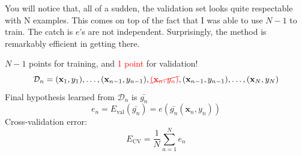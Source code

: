 \documentclass[10pt]{article}
\numberwithin{equation}{section}  %
\begin{document}
You will notice that, all of a sudden, the validation set looks quite respectable with N examples. This comes on top of the fact that I was able to use $N-1$ to train. The catch is $e$'s are not independent. Surprisingly, the method is remarkably efficient in getting there.

$N-1$ points for training, and \textcolor{red}{1 point} for validation!
\[
    \mathcal{D}_n = (\mathbf{x}_1,y_1), \dots, (\mathbf{x}_{n-1},y_{n-1}), \textcolor{red}{\cancel{(\mathbf{x}_n,y_n)}}, (\mathbf{x}_{n-1},y_{n-1}), \dots, (\mathbf{x}_N,y_N)
\]
Final hypothesis learned from $\mathcal{D}_n$ is $\bar{g_n}$
\[
    e_n = E_\mathrm{val}(\bar{g_n}) = e(\bar{g_n}(\mathbf{x}_n,y_n))
\]
Cross-validation error:
\[
    E_\mathrm{CV} = \frac{1}{N}\sum_{n=1}^Ne_n
\]
\end{document}
